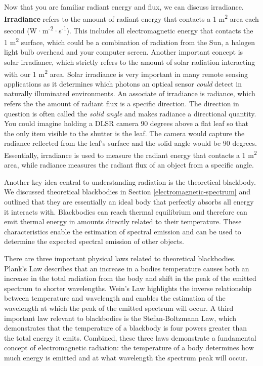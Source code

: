 \documentclass[
]{book}
\begin{document}
Now that you are familiar radiant energy and flux, we can discuss irradiance. \textbf{Irradiance} refers to the amount of radiant energy that contacts a 1 m\textsuperscript{2} area each second (W·m\textsuperscript{-2}·s\textsuperscript{-1}). This includes all electromagnetic energy that contacts the 1 m\textsuperscript{2} surface, which could be a combination of radiation from the Sun, a halogen light bulb overhead and your computer screen. Another important concept is solar irradiance, which strictly refers to the amount of solar radiation interacting with our 1 m\textsuperscript{2} area. Solar irradiance is very important in many remote sensing applications as it determines which photons an optical sensor \emph{could} detect in naturally illuminated environments. An associate of irradiance is radiance, which refers the the amount of radiant flux is a specific direction. The direction in question is often called the \emph{solid angle} and makes radiance a directional quantity. You could imagine holding a DLSR camera 90 degrees above a flat leaf so that the only item visible to the shutter is the leaf. The camera would capture the radiance reflected from the leaf's surface and the solid angle would be 90 degrees. Essentially, irradiance is used to measure the radiant energy that contacts a 1 m\textsuperscript{2} area, while radiance measures the radiant flux of an object from a specific angle.

Another key idea central to understanding radiation is the theoretical blackbody. We discussed theoretical blackbodies in Section \ref{electromagnetic-spectrum} and outlined that they are essentially an ideal body that perfectly absorbs all energy it interacts with. Blackbodies can reach thermal equilibrium and therefore can emit thermal energy in amounts directly related to their temperature. These characteristics enable the estimation of spectral emission and can be used to determine the expected spectral emission of other objects.

There are three important physical laws related to theoretical blackbodies. Plank's Law describes that an increase in a bodies temperature causes both an increase in the total radiation from the body and shift in the peak of the emitted spectrum to shorter wavelengths. Wein's Law highlights the inverse relationship between temperature and wavelength and enables the estimation of the wavelength at which the peak of the emitted spectrum will occur. A third important law relevant to blackbodies is the Stefan-Boltzmann Law, which demonstrates that the temperature of a blackbody is four powers greater than the total energy it emits. Combined, these three laws demonstrate a fundamental concept of electromagnetic radiation: the temperature of a body determines how much energy is emitted and at what wavelength the spectrum peak will occur.
\end{document}
